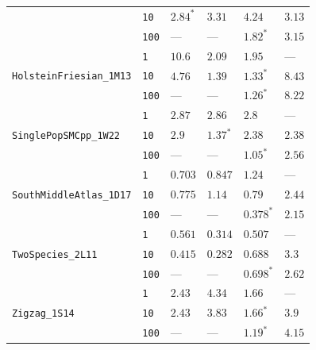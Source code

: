 \documentclass{article}
\begin{document}
\begin{footnotesize}
\begin{tabular}{llllll}
 & \texttt{10} & $\mathbf{2.84}^*$ & $3.31$ & $4.24$ & $3.13$ \\
 & \texttt{100} & --- & --- & $\mathbf{1.82}^*$ & $3.15$ \\
\cline{1-6}
\multirow[c]{3}{*}{\texttt{HolsteinFriesian\_1M13}} & \texttt{1} & $10.6$ & $2.09$ & $\mathbf{1.95}$ & --- \\
 & \texttt{10} & $4.76$ & $1.39$ & $\mathbf{1.33}^*$ & $8.43$ \\
 & \texttt{100} & --- & --- & $\mathbf{1.26}^*$ & $8.22$ \\
\cline{1-6}
\multirow[c]{3}{*}{\texttt{SinglePopSMCpp\_1W22}} & \texttt{1} & $2.87$ & $2.86$ & $\mathbf{2.8}$ & --- \\
 & \texttt{10} & $2.9$ & $\mathbf{1.37}^*$ & $2.38$ & $2.38$ \\
 & \texttt{100} & --- & --- & $\mathbf{1.05}^*$ & $2.56$ \\
\cline{1-6}
\multirow[c]{3}{*}{\texttt{SouthMiddleAtlas\_1D17}} & \texttt{1} & $\mathbf{0.703}$ & $0.847$ & $1.24$ & --- \\
 & \texttt{10} & $\mathbf{0.775}$ & $1.14$ & $0.79$ & $2.44$ \\
 & \texttt{100} & --- & --- & $\mathbf{0.378}^*$ & $2.15$ \\
\cline{1-6}
\multirow[c]{3}{*}{\texttt{TwoSpecies\_2L11}} & \texttt{1} & $0.561$ & $\mathbf{0.314}$ & $0.507$ & --- \\
 & \texttt{10} & $0.415$ & $\mathbf{0.282}$ & $0.688$ & $3.3$ \\
 & \texttt{100} & --- & --- & $\mathbf{0.698}^*$ & $2.62$ \\
\cline{1-6}
\multirow[c]{3}{*}{\texttt{Zigzag\_1S14}} & \texttt{1} & $2.43$ & $4.34$ & $\mathbf{1.66}$ & --- \\
 & \texttt{10} & $2.43$ & $3.83$ & $\mathbf{1.66}^*$ & $3.9$ \\
 & \texttt{100} & --- & --- & $\mathbf{1.19}^*$ & $4.15$ \\
\cline{1-6}
\bottomrule
\end{tabular}
\end{footnotesize}
\end{document}
